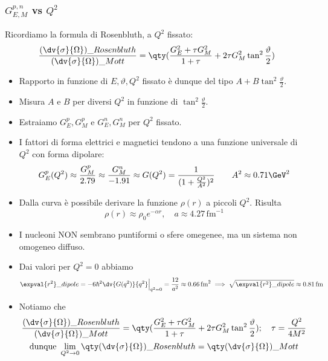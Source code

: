 \subsubsection{$G_{E,M}^{p,n}$ vs $Q^2$}
Ricordiamo la formula di Rosenbluth, a $Q^2$ fissato:
\begin{equation*}
    \frac {(\dv{\sigma}{\Omega})\_{Rosenbluth}}{(\dv{\sigma}{\Omega})\_{Mott}}=\qty(\frac{G_E^2+\tau G_M^2}{1+\tau}+2\tau G_M^2\tan^2\frac\vartheta2)
\end{equation*}
\begin{itemize}
    \item Rapporto in funzione di $E,\vartheta,Q^2$ fissato è dunque del tipo $A+B\tan^2\frac\vartheta2$.
    \item Misura $A$ e $B$ per diversi $Q^2$ in funzione di $\tan^2\frac\vartheta2$. 
    \item Estraiamo $G_E^p, G_M^p$ e $G_E^n, G_M^n$ per $Q^2$ fissato. 
    \item I fattori di forma elettrici e magnetici tendono a una funzione universale di $Q^2$ con forma dipolare:
    \begin{equation*}
    G_E^p(Q^2)\approx \frac{G_M^p}{2.79}\approx \frac{G_M^n}{-1.91}\approx G(Q^2)=\frac1{(1+\frac{Q^2}{A^2})^2}\qquad A^2\approx0.71\GeV^2
    \end{equation*} 
    \item Dalla curva è possibile derivare la funzione $\rho(r)$ a piccoli $Q^2$. Risulta
    \begin{equation*}
    \rho(r)\approx\rho_0e^{-\alpha r},\quad a\approx4.27\,\text{fm}^{-1}
    \end{equation*}
    \item I nucleoni NON sembrano puntiformi o sfere omegenee, ma un sistema non omogeneo diffuso.
    \item Dai valori per $Q^2=0$ abbiamo
    \begin{equation*}
    \expval{r^2}\_{dipole}=-6\hbar^2\dv{G(q^2)}{q^2}\Big|_{q^2=0}=\frac{12}{a^2}\approx0.66\,\text{fm}^2\implies \sqrt{\expval{r^2}\_{dipole}}\approx0.81\,\text{fm}
    \end{equation*}
    \item Notiamo che 
    \begin{gather*}
        \frac {(\dv{\sigma}{\Omega})\_{Rosenbluth}}{(\dv{\sigma}{\Omega})\_{Mott}}=\qty(\frac{G_E^2+\tau G_M^2}{1+\tau}+2\tau G_M^2\tan^2\frac\vartheta2);\quad \tau=\frac{Q^2}{4M^2}\\
        \text{dunque }\lim_{Q^2\to0} {\qty(\dv{\sigma}{\Omega})\_{Rosenbluth}}= \qty(\dv{\sigma}{\Omega})\_{Mott}

\end{gather*}
\end{itemize}
